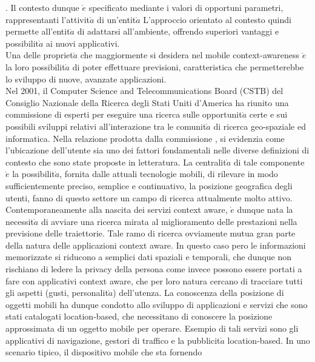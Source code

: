 \cite{cit_48}. Il contesto dunque $\grave{e}$ specificato
mediante i valori di opportuni parametri, rappresentanti l'attivit$\grave{a}$ di un'entit$\grave{a}$
L'approccio orientato al contesto quindi permette all'entit$\grave{a}$ di adattarsi all'ambiente,
offrendo superiori vantaggi e possibilit$\grave{a}$ ai nuovi applicativi.\\
Una delle propriet$\grave{a}$ che maggiormente si desidera nel mobile context-awareness
$\grave{e}$ la loro possibilit$\grave{a}$ di poter effettuare previsioni, caratteristica che permetterebbe
lo sviluppo di nuove, avanzate applicazioni.\\
Nel 2001, il Computer Science and Telecommunications Board (CSTB) del
Consiglio Nazionale della Ricerca degli Stati Uniti d'America ha riunito una
commissione di esperti per eseguire una ricerca sulle opportunit$\grave{a}$ certe e sui
possibili sviluppi relativi all'interazione tra le comunit$\grave{a}$ di ricerca geo-spaziale
ed informatica. Nella relazione prodotta dalla commissione \cite{cit_47}, si evidenzia
come l'ubicazione dell'utente sia uno dei fattori fondamentali nelle diverse
definizioni di contesto che sono state proposte in letteratura. La centralit$\grave{a}$
di tale componente $\grave{e}$ la possibilit$\grave{a}$, fornita dalle attuali tecnologie mobili, di
rilevare in modo sufficientemente preciso, semplice e continuativo, la posizione
geografica degli utenti, fanno di questo settore un campo di ricerca attualmente
molto attivo.\\
Contemporaneamente alla nascita dei servizi context aware, $\grave{e}$ dunque nata
la necessit$\grave{a}$ di avviare una ricerca mirata al miglioramento delle prestazioni
nella previsione delle traiettorie. Tale ramo di ricerca ovviamente mutua gran
parte della natura delle applicazioni context aware. In questo caso pero le
informazioni memorizzate si riducono a semplici dati spaziali e temporali, che
dunque non rischiano di ledere la privacy della persona come invece possono
essere portati a fare con applicativi context aware, che per loro natura cercano
di tracciare tutti gli aspetti (gusti, personalit$\grave{a}$) dell'utenza. La conoscenza della
posizione di oggetti mobili ha dunque condotto allo sviluppo di applicazioni
e servizi che sono stati catalogati location-based, che necessitano di conoscere
la posizione approssimata di un oggetto mobile per operare. Esempio di tali
servizi sono gli applicativi di navigazione, gestori di traffico e la pubblicit$\grave{a}$
location-based. In uno scenario tipico, il dispositivo mobile che sta fornendo
